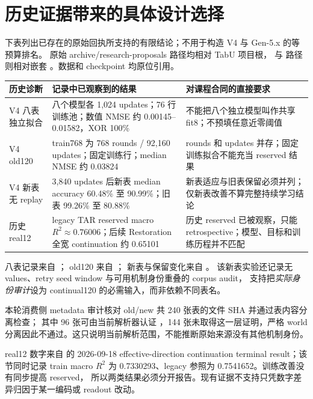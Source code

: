 \documentclass[10pt,UTF8,fontset=fandol]{ctexart}
\newcommand{\code}[1]{\texttt{\detokenize{#1}}}
\begin{document}
\newpage
\section{历史证据带来的具体设计选择}
下表列出已存在的原始回执所支持的有限结论；不用于构造 V4 与 Gen-5.x 的等预算排名。
原始 archive/research-proposals 路径均相对 TabU 项目根，\code{docs/} 与 \code{src/}
路径则相对嵌套 \code{tabu-lab}。数据和 checkpoint 均原位引用。

\begin{center}\small
\begin{tabularx}{\linewidth}{@{}p{23mm}YY@{}}\toprule
历史诊断 & 记录中已观察到的结果 & 对课程合同的直接要求 \\\midrule
V4 八表独立拟合 & 八个模型各 1,024 updates；76 行训练池；数值 NMSE 约 0.00145--0.01582，XOR 100\% & 不能把八个独立模型叫作共享 fit8；不预填任意近零阈值 \\
V4 old120 & train768 为 768 rounds / 92,160 updates；固定训练行；median NMSE 约 0.03824 & rounds 和 updates 并存；固定训练拟合不能充当 reserved 结果 \\
V4 新表无 replay & 3,840 updates 后新表 median accuracy 60.48\% 至 90.99\%；旧表 99.26\% 至 80.88\% & 新表适应与旧表保留必须并列；仅新表改善不算完整持续学习结论 \\
历史 real12 & legacy TAR reserved macro $R^2\approx0.76006$；后续 Restoration 全宽 continuation 约 0.65101 & 历史 reserved 已被观察，只能 retrospective；模型、目标和训练历程并不匹配 \\\bottomrule
\end{tabularx}
\end{center}

\begingroup\raggedright
八表记录来自 ；
old120 来自 ；
新表与保留变化来自 。
该新表实验还记录无 values、retry seed window 与可用机制身份重叠的 corpus audit，
支持把\emph{实际身份审计}设为 continual120 的必需输入，而非依赖不同表名。
\par\endgroup

本轮消费侧 metadata 审计核对 old/new 共 240 张表的文件 SHA 并通过表内容分离检查；
其中 96 张可由当前解析器认证 \code{world_hash}，144 张未取得这一层证明，严格 world
分离因此不通过。这只说明当前解析范围，不能推断原始来源没有其他机制身份。

real12 数字来自 
的 2026-09-18 effective-direction continuation terminal result；该节同时记录
train macro $R^2$ 为 0.7330293、legacy 参照为 0.7541652。训练改善没有同步提高 reserved，
所以两类结果必须分开报告。现有证据不支持只凭数字差异归因于某一编码或 readout 改动。
\end{document}
